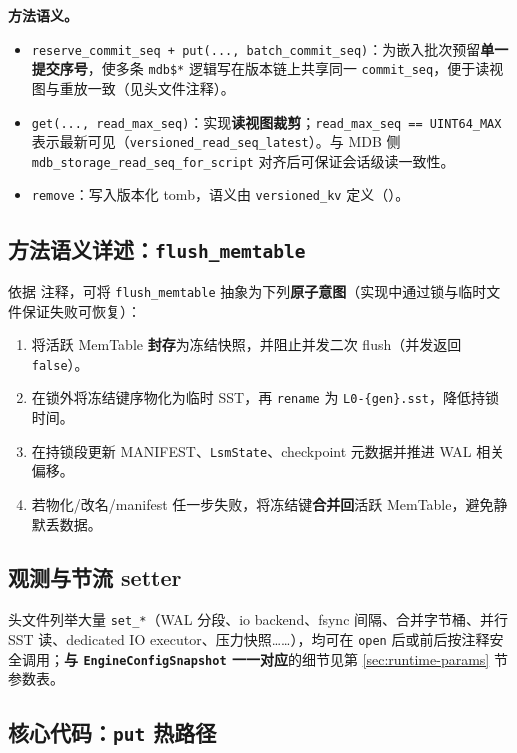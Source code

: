 \noindent\textbf{方法语义。}
\begin{itemize}
  \item \texttt{reserve\_commit\_seq + put(..., batch\_commit\_seq)}：为嵌入批次预留\textbf{单一提交序号}，使多条 \texttt{mdb\$*} 逻辑写在版本链上共享同一 \texttt{commit\_seq}，便于读视图与重放一致（见头文件注释）。
  \item \texttt{get(..., read\_max\_seq)}：实现\textbf{读视图裁剪}；\texttt{read\_max\_seq == UINT64\_MAX} 表示最新可见（\texttt{versioned\_read\_seq\_latest}）。与 MDB 侧 \texttt{mdb\_storage\_read\_seq\_for\_script} 对齐后可保证会话级读一致性。
  \item \texttt{remove}：写入版本化 tomb，语义由 \texttt{versioned\_kv} 定义（）。
\end{itemize}

\subsection{方法语义详述：\texttt{flush\_memtable}}

依据  注释，可将 \texttt{flush\_memtable} 抽象为下列\textbf{原子意图}（实现中通过锁与临时文件保证失败可恢复）：
\begin{enumerate}
  \item 将活跃 MemTable \textbf{封存}为冻结快照，并阻止并发二次 flush（并发返回 \texttt{false}）。
  \item 在锁外将冻结键序物化为临时 SST，再 \texttt{rename} 为 \texttt{L0-\{gen\}.sst}，降低持锁时间。
  \item 在持锁段更新 MANIFEST、\texttt{LsmState}、checkpoint 元数据并推进 WAL 相关偏移。
  \item 若物化/改名/manifest 任一步失败，将冻结键\textbf{合并回}活跃 MemTable，避免静默丢数据。
\end{enumerate}

\subsection{观测与节流 setter}

头文件列举大量 \texttt{set\_*}（WAL 分段、io backend、fsync 间隔、合并字节桶、并行 SST 读、dedicated IO executor、压力快照……），均可在 \texttt{open} 后或前后按注释安全调用；\textbf{与 \texttt{EngineConfigSnapshot} 一一对应}的细节见第 \ref{sec:runtime-params} 节参数表。

\subsection{核心代码：\texttt{put} 热路径}

